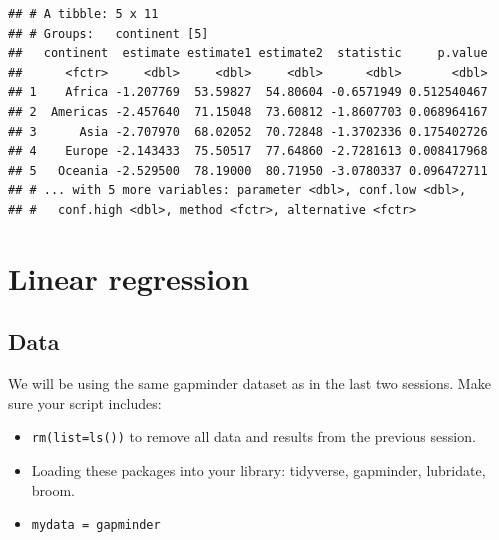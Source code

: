 \documentclass[]{book}
\makeatletter
\newenvironment{Shaded}{\begin{snugshade}}{\end{snugshade}}
\newcommand{\KeywordTok}[1]{\textcolor[rgb]{0.13,0.29,0.53}{\textbf{#1}}}
\newcommand{\DataTypeTok}[1]{\textcolor[rgb]{0.13,0.29,0.53}{#1}}
\newcommand{\DecValTok}[1]{\textcolor[rgb]{0.00,0.00,0.81}{#1}}
\newcommand{\StringTok}[1]{\textcolor[rgb]{0.31,0.60,0.02}{#1}}
\newcommand{\OperatorTok}[1]{\textcolor[rgb]{0.81,0.36,0.00}{\textbf{#1}}}
\newcommand{\NormalTok}[1]{#1}
\providecommand{\tightlist}{%
  \setlength{\itemsep}{0pt}\setlength{\parskip}{0pt}}
\newenvironment{kframe}{%
\medskip{}
\setlength{\fboxsep}{.8em}
 \def\at@end@of@kframe{}%
 \ifinner\ifhmode%
  \def\at@end@of@kframe{\end{minipage}}%
  \begin{minipage}{\columnwidth}%
 \fi\fi%
 \def\FrameCommand##1{\hskip\@totalleftmargin \hskip-\fboxsep
 \colorbox{shadecolor}{##1}\hskip-\fboxsep
     \hskip-\linewidth \hskip-\@totalleftmargin \hskip\columnwidth}%
 \MakeFramed {\advance\hsize-\width
   \@totalleftmargin\z@ \linewidth\hsize
   \@setminipage}}%
 {\par\unskip\endMakeFramed%
 \at@end@of@kframe}
\renewenvironment{Shaded}{\begin{kframe}}{\end{kframe}}
\makeatother
\begin{document}
\begin{Shaded}
\end{Shaded}

\begin{verbatim}
## # A tibble: 5 x 11
## # Groups:   continent [5]
##   continent  estimate estimate1 estimate2  statistic     p.value
##      <fctr>     <dbl>     <dbl>     <dbl>      <dbl>       <dbl>
## 1    Africa -1.207769  53.59827  54.80604 -0.6571949 0.512540467
## 2  Americas -2.457640  71.15048  73.60812 -1.8607703 0.068964167
## 3      Asia -2.707970  68.02052  70.72848 -1.3702336 0.175402726
## 4    Europe -2.143433  75.50517  77.64860 -2.7281613 0.008417968
## 5   Oceania -2.529500  78.19000  80.71950 -3.0780337 0.096472711
## # ... with 5 more variables: parameter <dbl>, conf.low <dbl>,
## #   conf.high <dbl>, method <fctr>, alternative <fctr>
\end{verbatim}

\chapter{Linear regression}\label{linear-regression}

\section{Data}\label{data-3}

We will be using the same gapminder dataset as in the last two sessions.
Make sure your script includes:

\begin{itemize}
\tightlist
\item
  \texttt{rm(list=ls())} to remove all data and results from the
  previous session.
\item
  Loading these packages into your library: tidyverse, gapminder,
  lubridate, broom.
\item
  \texttt{mydata\ =\ gapminder}
\end{itemize}
\end{document}
